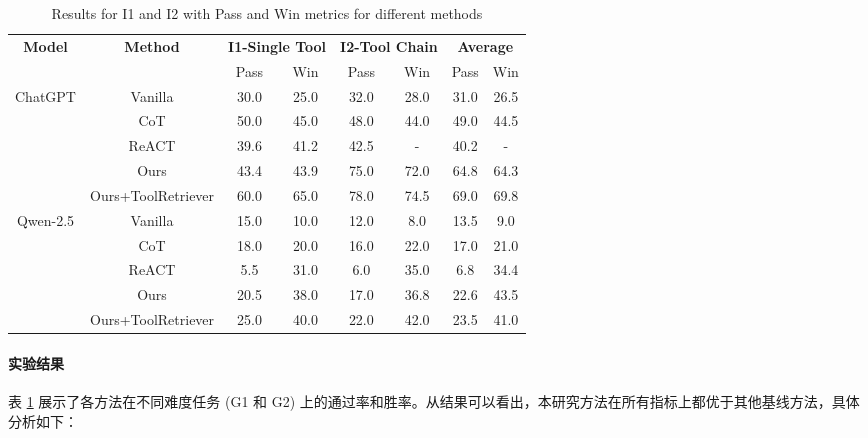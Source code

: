 \begin{table}[!ht]
  \centering
  \begin{tabular}{c|c|cc|cc|cc}
  \toprule
  \textbf{Model} & \textbf{Method} & \multicolumn{2}{c|}{\textbf{I1-Single Tool}} & \multicolumn{2}{c|}{\textbf{I2-Tool Chain}} & \multicolumn{2}{c}{\textbf{Average}} \\
  & & Pass & Win & Pass & Win & Pass & Win \\
  \midrule
  ChatGPT & Vanilla          & 30.0 & 25.0 & 32.0 & 28.0 & 31.0 & 26.5 \\
          & CoT              & 50.0 & 45.0 & 48.0 & 44.0 & 49.0 & 44.5 \\
          & ReACT            & 39.6 & 41.2    & 42.5 & -    & 40.2 & -    \\
          & Ours             & 43.4 & 43.9 & 75.0 & 72.0 & 64.8 & 64.3 \\
          & Ours+ToolRetriever & 60.0 & 65.0 & 78.0 & 74.5 & 69.0 & 69.8 \\
  \midrule
  Qwen-2.5 & Vanilla          & 15.0 & 10.0 & 12.0 & 8.0  & 13.5 & 9.0  \\
           & CoT              & 18.0 & 20.0 & 16.0 & 22.0 & 17.0 & 21.0 \\
           & ReACT            & 5.5  & 31.0 & 6.0  & 35.0 & 6.8  & 34.4 \\
           & Ours             & 20.5 & 38.0 & 17.0 & 36.8 & 22.6 & 43.5 \\
           & Ours+ToolRetriever & 25.0 & 40.0 & 22.0 & 42.0 & 23.5 & 41.0 \\
  \bottomrule
  \end{tabular}
  \caption{Results for I1 and I2 with Pass and Win metrics for different methods}
  \label{tab:simplified_pass_win}
\end{table}

\paragraph{实验结果}

表 \ref{tab:simplified_pass_win} 展示了各方法在不同难度任务 (G1 和 G2) 上的通过率和胜率。从结果可以看出，本研究方法在所有指标上都优于其他基线方法，具体分析如下：

